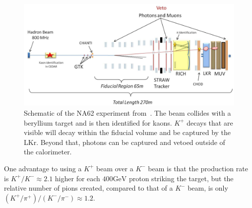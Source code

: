 \begin{figure}[h]
    \centering
    \includegraphics[width=\textwidth]{Figures/experiments/na62_schematic}
    \caption{Schematic of the NA62 experiment from~\cite{Martellotti:2015kna}. The beam collides with a beryllium target and is then identified for kaons. $K^+$ decays that are visible will decay within the fiducial volume and be captured by the LKr. Beyond that, photons can be captured and vetoed outside of the calorimeter.}
    \label{fig:na62_experiment}
\end{figure}

One advantage to using a $K^+$ beam over a $K^-$ beam is that the production rate is $K^+ / K^- \approx 2.1$ higher for each $400\textrm{GeV}$ proton striking the target, but the relative number of pions created, compared to that of a $K^-$ beam, is only $(K^+ / \pi^+) / (K^- / \pi^-) \approx 1.2$.
